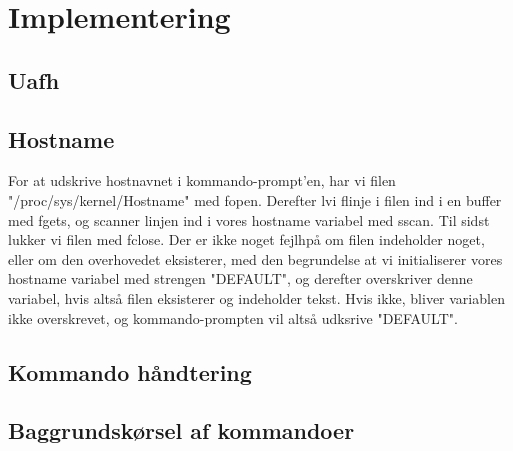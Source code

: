 \section{Implementering}
\subsection{Uafh}

\subsection{Hostname}
For at udskrive hostnavnet i kommando-prompt'en, har vi  filen "/proc/sys/kernel/Hostname" med fopen. Derefter l vi f linje i filen ind i en buffer med fgets, og scanner linjen ind i vores hostname variabel med sscan. Til sidst lukker vi filen med fclose. Der er ikke noget fejlh på om filen indeholder noget, eller om den overhovedet eksisterer, med den begrundelse at vi initialiserer vores hostname variabel med strengen "DEFAULT", og derefter overskriver denne variabel, hvis altså filen eksisterer og indeholder tekst. Hvis ikke, bliver variablen ikke overskrevet, og kommando-prompten vil altså udksrive "DEFAULT".

\subsection{Kommando håndtering}

\subsection{Baggrundskørsel af kommandoer}

\subsection{}

